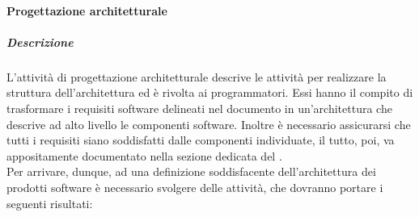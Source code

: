 \paragraph{Progettazione architetturale}

\subparagraph{Descrizione}
L'attività di progettazione architetturale descrive le attività per realizzare la struttura dell'architettura ed è rivolta ai programmatori. Essi hanno il compito di trasformare i requisiti software delineati nel documento \AdR{} in un'architettura che descrive ad alto livello le componenti software. Inoltre è necessario assicurarsi che tutti i requisiti siano soddisfatti dalle componenti individuate, il tutto, poi, va appositamente documentato nella sezione dedicata del \DDP{}. \\
Per arrivare, dunque, ad una definizione soddisfacente dell'architettura dei prodotti software è necessario svolgere delle attività, che dovranno portare i seguenti risultati:

